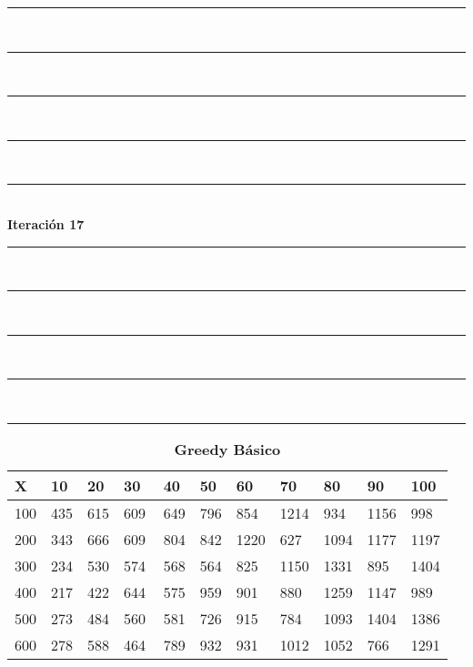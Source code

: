 \documentclass[10pt,letterpaper]{article}
\begin{document}
\newpage 
\begin{center}
\newcommand{\HRule}{\rule{\linewidth}{0.5mm}}
\center
\HRule\\[6cm]
\HRule\\[0.4cm]
\HRule\\[0.4cm]
\HRule\\[0.4cm]
\HRule\\[0.4cm]
{\centering \Huge\bfseries Iteración 17}\\[0.4cm]
\HRule\\[0.4cm]
\HRule\\[0.4cm]
\HRule\\[0.4cm]
\HRule\\[6cm]
\HRule
\end{center}
\newpage 
{}
\begin{center}
\begin{table}\renewcommand{\arraystretch}{2.5}
\caption{\large \textbf{Greedy Básico}}
\centering
\begin{tabular} { |m{0.5cm}|m{1.3cm}|m{1.3cm}|m{1.3cm}|m{1.3cm}|m{1.3cm}|m{1.3cm}|m{1.3cm}|m{1.3cm}|m{1.3cm}|m{1.3cm}|} 
\hline
\rowcolor{Gray}
\centering \textbf{X} & \centering \textbf{10} & \centering \textbf{20} & \centering \textbf{30}\ & \centering \textbf{40} & \centering \textbf{50} & \centering \textbf{60}\ & \centering \textbf{70} & \centering \textbf{80} & \centering \textbf{90}\ & \textbf{100} \\\hline
\cellcolor{Gray}100 & \Large 435 & \Large 615 & \Large 609 & \Large 649 & \Large 796 & \Large 854 & \Large 1214 & \Large 934 & \Large 1156 & \Large 998 \\
\hline
\cellcolor{Gray}200 & \Large 343 & \Large 666 & \Large 609 & \Large 804 & \Large 842 & \Large 1220 & \Large 627 & \Large 1094 & \Large 1177 & \Large 1197 \\
\hline
\cellcolor{Gray}300 & \Large 234 & \Large 530 & \Large 574 & \Large 568 & \Large 564 & \Large 825 & \Large 1150 & \Large 1331 & \Large 895 & \Large 1404 \\
\hline
\cellcolor{Gray}400 & \Large 217 & \Large 422 & \Large 644 & \Large 575 & \Large 959 & \Large 901 & \Large 880 & \Large 1259 & \Large 1147 & \Large 989 \\
\hline
\cellcolor{Gray}500 & \Large 273 & \Large 484 & \Large 560 & \Large 581 & \Large 726 & \Large 915 & \Large 784 & \Large 1093 & \Large 1404 & \Large 1386 \\
\hline
\cellcolor{Gray}600 & \Large 278 & \Large 588 & \Large 464 & \Large 789 & \Large 932 & \Large 931 & \Large 1012 & \Large 1052 & \Large 766 & \Large 1291 \\

\end{tabular}
\end{table}
\end{center}
\end{document}
